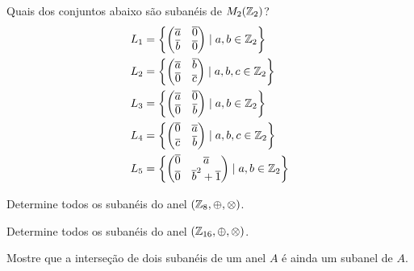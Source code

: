 \documentclass[12pt]{exam}
\begin{document}
    \vspace{.3cm}

    \questao{} Quais dos conjuntos abaixo são subanéis de $M_2(\mathbb{Z}_2)$?
    \begin{align*}
        L_1 &= \left\{\begin{pmatrix}
            \overline{a} & \overline{0}\\
            \overline{b} & \overline{0}
        \end{pmatrix} \mid a, b \in \mathbb{Z}_2\right\}\\
        L_2 &= \left\{\begin{pmatrix}
            \overline{a} & \overline{b}\\
            \overline{0} & \overline{c}
        \end{pmatrix} \mid a, b, c \in \mathbb{Z}_2\right\}\\
        L_3 &= \left\{\begin{pmatrix}
            \overline{a} & \overline{0}\\
            \overline{0} & \overline{b}
        \end{pmatrix} \mid a, b \in \mathbb{Z}_2\right\}\\
        L_4 &= \left\{\begin{pmatrix}
            \overline{0} & \overline{a}\\
            \overline{c} & \overline{b}
        \end{pmatrix} \mid a, b, c \in \mathbb{Z}_2\right\}\\
        L_5 &= \left\{\begin{pmatrix}
            \overline{0} & \overline{a}\\
            \overline{0} & \overline{b}^2 + \overline{1}
        \end{pmatrix} \mid a, b \in \mathbb{Z}_2\right\}
    \end{align*}

    \vspace{.3cm}

    \questao{} Determine todos os subanéis do anel $(\mathbb{Z}_8, \oplus, \otimes)$.

    \vspace{.3cm}

    \questao{} Determine todos os subanéis do anel $(\mathbb{Z}_{16}, \oplus, \otimes)$.

    \vspace{.3cm}

    \questao{} Mostre que a interseção de dois subanéis de um anel $A$ é ainda um subanel de $A$.
\end{document}
